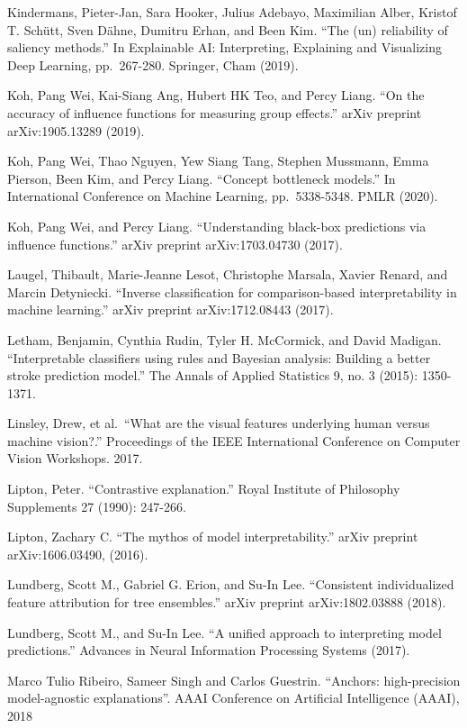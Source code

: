 \documentclass[
  10pt,
]{scrbook}
\begin{document}
Kindermans, Pieter-Jan, Sara Hooker, Julius Adebayo, Maximilian Alber, Kristof T. Schütt, Sven Dähne, Dumitru Erhan, and Been Kim. ``The (un) reliability of saliency methods.'' In Explainable AI: Interpreting, Explaining and Visualizing Deep Learning, pp.~267-280. Springer, Cham (2019).

Koh, Pang Wei, Kai-Siang Ang, Hubert HK Teo, and Percy Liang. ``On the accuracy of influence functions for measuring group effects.'' arXiv preprint arXiv:1905.13289 (2019).

Koh, Pang Wei, Thao Nguyen, Yew Siang Tang, Stephen Mussmann, Emma Pierson, Been Kim, and Percy Liang. ``Concept bottleneck models.'' In International Conference on Machine Learning, pp.~5338-5348. PMLR (2020).

Koh, Pang Wei, and Percy Liang. ``Understanding black-box predictions via influence functions.'' arXiv preprint arXiv:1703.04730 (2017).

Laugel, Thibault, Marie-Jeanne Lesot, Christophe Marsala, Xavier Renard, and Marcin Detyniecki. ``Inverse classification for comparison-based interpretability in machine learning.'' arXiv preprint arXiv:1712.08443 (2017).

Letham, Benjamin, Cynthia Rudin, Tyler H. McCormick, and David Madigan. ``Interpretable classifiers using rules and Bayesian analysis: Building a better stroke prediction model.'' The Annals of Applied Statistics 9, no. 3 (2015): 1350-1371.

Linsley, Drew, et al.~``What are the visual features underlying human versus machine vision?.'' Proceedings of the IEEE International Conference on Computer Vision Workshops. 2017.

Lipton, Peter. ``Contrastive explanation.'' Royal Institute of Philosophy Supplements 27 (1990): 247-266.

Lipton, Zachary C. ``The mythos of model interpretability.'' arXiv preprint arXiv:1606.03490, (2016).

Lundberg, Scott M., Gabriel G. Erion, and Su-In Lee. ``Consistent individualized feature attribution for tree ensembles.'' arXiv preprint arXiv:1802.03888 (2018).

Lundberg, Scott M., and Su-In Lee. ``A unified approach to interpreting model predictions.'' Advances in Neural Information Processing Systems (2017).

Marco Tulio Ribeiro, Sameer Singh and Carlos Guestrin. ``Anchors: high-precision model-agnostic explanations''. AAAI Conference on Artificial Intelligence (AAAI), 2018
\end{document}
